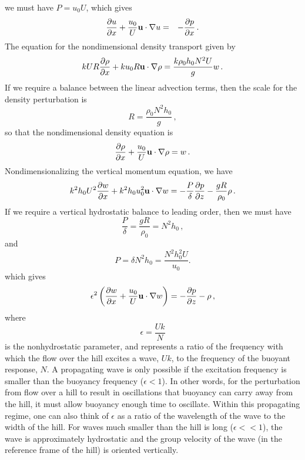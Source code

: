 \documentclass[12pt]{article}
\begin{document}
	we must have $P = u_0 U$, which gives
	\begin{eqnarray*}
	\frac{\partial{u}}{\partial{x}} + \frac{u_0}{U} \mathbf{u}\cdot\nabla u &=& -\frac{\partial{p}}{\partial{x}}\,.
	\end{eqnarray*}
	The equation for the nondimensional density transport given by
	\[
	k U R \frac{\partial{\rho}}{\partial{x}} + k u_0 R \mathbf{u}\cdot\nabla\rho = \frac{k \rho_0 h_0 N^2 U}{g} w\,.
	\]
	If we require a balance between the linear advection terms, then the scale for the density
	perturbation is 
	\[
	R = \frac{\rho_0 N^2 h_0}{g}\,,
	\]
	so that the nondimensional density equation is
	\[
	\frac{\partial{\rho}}{\partial{x}} + \frac{u_0}{U} \mathbf{u}\cdot\nabla\rho = w\,.
	\]
	Nondimensionalizing the vertical momentum equation, we have
	\[
	k^2 h_0 U^2 \frac{\partial{w}}{\partial{x}} + k^2 h_0 u_0^2\mathbf{u}\cdot\nabla w = -\frac{P}{\delta}\frac{\partial{p}}{\partial{z}} - \frac{g R}{\rho_0} \rho\,.
	\]
	If we require a vertical hydrostatic balance to leading order, then we must have 
	\[
	\frac{P}{\delta} = \frac{g R}{\rho_0} 
	= N^2 h_0\,,
	\]
	and
	\[
	P = \delta N^2h_0
	= \frac{N^2h_0^2U}{u_0}.
	\]
	which gives
	\[
	\epsilon^2 \left(\frac{\partial{w}}{\partial{x}} + \frac{u_0}{U}\mathbf{u}\cdot\nabla w\right) = -\frac{\partial{p}}{\partial{z}} - \rho\,,
	\]
	where 
	\[
	\epsilon = \frac{Uk}{N}
	\]
	is the nonhydrostatic parameter, and represents a ratio of the frequency with which the flow over the hill excites a wave, $Uk$, to the frequency of the buoyant response, $N$. A propagating wave is only possible if the excitation frequency is smaller than the buoyancy frequency ($\epsilon<1$). In other words, for the perturbation from flow over a hill to result in oscillations that buoyancy can carry away from the hill, it must allow buoyancy enough time to oscillate. Within this propagating regime, one can also think of $\epsilon$ as a ratio of the wavelength of the wave to the width of the hill. For waves much smaller than the hill is long ($\epsilon<<1$), the wave is approximately hydrostatic and the group velocity of the wave (in the reference frame of the hill) is oriented vertically. 
	
\end{document}
